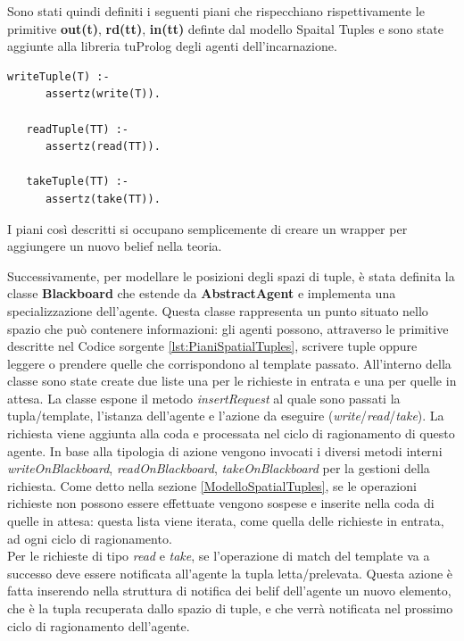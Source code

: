 \documentclass[12pt,a4paper,openright,twoside]{report}
\begin{document}
Sono stati quindi definiti i seguenti piani che rispecchiano rispettivamente le primitive \textbf{out(t)}, \textbf{rd(tt)}, \textbf{in(tt)} definte dal modello Spaital Tuples e sono state aggiunte alla libreria tuProlog degli agenti dell'incarnazione.
\medskip
\begin{lstlisting}[firstnumber=1,label={lst:PianiSpatialTuples},caption={Piani Spatial Tuples}]
   writeTuple(T) :-
      assertz(write(T)).

   readTuple(TT) :-
      assertz(read(TT)).

   takeTuple(TT) :-
      assertz(take(TT)).
\end{lstlisting}

I piani cos\`i descritti si occupano semplicemente di creare un wrapper per aggiungere un nuovo belief nella teoria.

Successivamente, per modellare le posizioni degli spazi di tuple, \`e stata definita la classe \textbf{Blackboard} che estende da \textbf{AbstractAgent} e implementa una specializzazione dell'agente. Questa classe rappresenta un punto situato nello spazio che pu\`o contenere informazioni: gli agenti possono, attraverso le primitive descritte nel Codice sorgente \ref{lst:PianiSpatialTuples}, scrivere tuple oppure leggere o prendere quelle che corrispondono al template passato.
All'interno della classe sono state create due liste una per le richieste in entrata e una per quelle in attesa. La classe espone il metodo \textit{insertRequest} al quale sono passati la tupla/template, l'istanza dell'agente e l'azione da eseguire (\textit{write}/\textit{read}/\textit{take}). La richiesta viene aggiunta alla coda e processata nel ciclo di ragionamento di questo agente. In base alla tipologia di azione vengono invocati i diversi metodi interni \textit{writeOnBlackboard}, \textit{readOnBlackboard}, \textit{takeOnBlackboard} per la gestioni della richiesta.
Come detto nella sezione \ref{ModelloSpatialTuples}, se le operazioni richieste non possono essere effettuate vengono sospese e inserite nella coda di quelle in attesa: questa lista viene iterata, come quella delle richieste in entrata, ad ogni ciclo di ragionamento.
\\
Per le richieste di tipo \textit{read} e \textit{take}, se l'operazione di match del template va a successo deve essere notificata all'agente la tupla letta/prelevata. Questa azione \`e fatta inserendo nella struttura di notifica dei belif dell'agente un nuovo elemento, che \`e la tupla recuperata dallo spazio di tuple, e che verr\`a notificata nel prossimo ciclo di ragionamento dell'agente.
\end{document}
